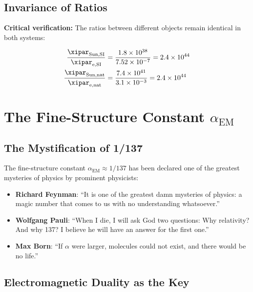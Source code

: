 	\subsection{Invariance of Ratios}
	\label{subsec:xi_ratio_invariance}
	
	\textbf{Critical verification:} The ratios between different objects remain identical in both systems:
	
	\begin{align}
		\frac{\xipar_{\text{Sun},\text{SI}}}{\xipar_{\text{e},\text{SI}}} &= \frac{1.8 \times 10^{38}}{7.52 \times 10^{-7}} = 2.4 \times 10^{44} \\
		\frac{\xipar_{\text{Sun},\text{nat}}}{\xipar_{\text{e},\text{nat}}} &= \frac{7.4 \times 10^{41}}{3.1 \times 10^{-3}} = 2.4 \times 10^{44}
	\end{align}
	
	
\section{The Fine-Structure Constant $\alpha_{\text{EM}}$}
\label{sec:alpha_em}

\subsection{The Mystification of 1/137}
\label{subsec:alpha_mystification}

The fine-structure constant $\alpha_{\text{EM}} \approx 1/137$ has been declared one of the greatest mysteries of physics by prominent physicists:

\begin{itemize}
	\item \textbf{Richard Feynman}: ``It is one of the greatest damn mysteries of physics: a magic number that comes to us with no understanding whatsoever.''
	\item \textbf{Wolfgang Pauli}: ``When I die, I will ask God two questions: Why relativity? And why 137? I believe he will have an answer for the first one.''
	\item \textbf{Max Born}: ``If $\alpha$ were larger, molecules could not exist, and there would be no life.''
\end{itemize}

\subsection{Electromagnetic Duality as the Key}
\label{subsec:electromagnetic_duality}

